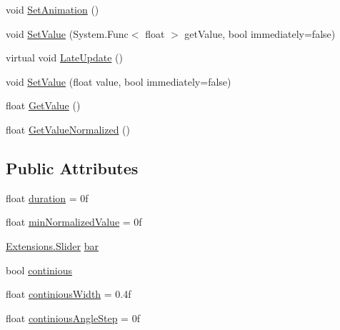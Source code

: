 \begin{DoxyCompactItemize}
\item 
void \hyperlink{class_unity_engine_1_1_u_i_1_1_windows_1_1_components_1_1_progress_component_a08f0d9d4075878406f3a8d7fb65c2b67}{Set\+Animation} ()
\item 
void \hyperlink{class_unity_engine_1_1_u_i_1_1_windows_1_1_components_1_1_progress_component_a40d690577f49f93dfad73f317cf1eae8}{Set\+Value} (System.\+Func$<$ float $>$ get\+Value, bool immediately=false)
\item 
virtual void \hyperlink{class_unity_engine_1_1_u_i_1_1_windows_1_1_components_1_1_progress_component_a663cb6f2dda3d06e88e681fadbc2aff2}{Late\+Update} ()
\item 
void \hyperlink{class_unity_engine_1_1_u_i_1_1_windows_1_1_components_1_1_progress_component_a0fb13fc70b698231a8c6c6d76cbadf10}{Set\+Value} (float value, bool immediately=false)
\item 
float \hyperlink{class_unity_engine_1_1_u_i_1_1_windows_1_1_components_1_1_progress_component_aadfab0429697f4c32c55ef787ff9e66d}{Get\+Value} ()
\item 
float \hyperlink{class_unity_engine_1_1_u_i_1_1_windows_1_1_components_1_1_progress_component_aa316a3b7a9517cb2dbdcf7d63c45d345}{Get\+Value\+Normalized} ()
\end{DoxyCompactItemize}
\subsection*{Public Attributes}
\begin{DoxyCompactItemize}
\item 
float \hyperlink{class_unity_engine_1_1_u_i_1_1_windows_1_1_components_1_1_progress_component_a66a027327d9cde90ec6ea763353f0659}{duration} = 0f
\item 
float \hyperlink{class_unity_engine_1_1_u_i_1_1_windows_1_1_components_1_1_progress_component_a4e4956ed8586fd6d47fe91596d95ce8f}{min\+Normalized\+Value} = 0f
\item 
\hyperlink{class_unity_engine_1_1_u_i_1_1_windows_1_1_extensions_1_1_slider}{Extensions.\+Slider} \hyperlink{class_unity_engine_1_1_u_i_1_1_windows_1_1_components_1_1_progress_component_a8d67c32102430c2b126de9c3db653f81}{bar}
\item 
bool \hyperlink{class_unity_engine_1_1_u_i_1_1_windows_1_1_components_1_1_progress_component_a5042731cacc142e0d5f494641eb40591}{continious}
\item 
float \hyperlink{class_unity_engine_1_1_u_i_1_1_windows_1_1_components_1_1_progress_component_af70cf7358cf9773fadc7ac61cfc0d514}{continious\+Width} = 0.\+4f
\item 
float \hyperlink{class_unity_engine_1_1_u_i_1_1_windows_1_1_components_1_1_progress_component_a1a0c7e06bc41253af975313c6c4d1452}{continious\+Angle\+Step} = 0f
\end{DoxyCompactItemize}


